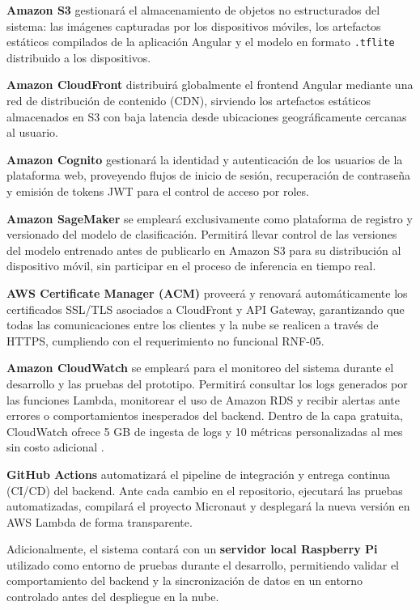 \textbf{Amazon S3} gestionará el almacenamiento de objetos no
estructurados del sistema: las imágenes capturadas por los dispositivos
móviles, los artefactos estáticos compilados de la aplicación Angular
y el modelo en formato \texttt{.tflite} distribuido a los dispositivos.

\textbf{Amazon CloudFront} distribuirá globalmente el frontend Angular
mediante una red de distribución de contenido (CDN), sirviendo los
artefactos estáticos almacenados en S3 con baja latencia desde
ubicaciones geográficamente cercanas al usuario.

\textbf{Amazon Cognito} gestionará la identidad y autenticación de
los usuarios de la plataforma web, proveyendo flujos de inicio de
sesión, recuperación de contraseña y emisión de tokens JWT para el
control de acceso por roles.

\textbf{Amazon SageMaker} se empleará exclusivamente como plataforma
de registro y versionado del modelo de clasificación. Permitirá llevar
control de las versiones del modelo entrenado antes de publicarlo en
Amazon S3 para su distribución al dispositivo móvil, sin participar
en el proceso de inferencia en tiempo real.

\textbf{AWS Certificate Manager (ACM)} proveerá y renovará
automáticamente los certificados SSL/TLS asociados a CloudFront y
API Gateway, garantizando que todas las comunicaciones entre los
clientes y la nube se realicen a través de HTTPS, cumpliendo con el
requerimiento no funcional RNF-05.

\textbf{Amazon CloudWatch} se empleará para el monitoreo del sistema
durante el desarrollo y las pruebas del prototipo. Permitirá consultar
los logs generados por las funciones Lambda, monitorear el uso de
Amazon RDS y recibir alertas ante errores o comportamientos inesperados
del backend. Dentro de la capa gratuita, CloudWatch ofrece 5 GB de
ingesta de logs y 10 métricas personalizadas al mes sin costo adicional
\cite{aws_free_tier}.

\textbf{GitHub Actions} automatizará el pipeline de integración y
entrega continua (CI/CD) del backend. Ante cada cambio en el
repositorio, ejecutará las pruebas automatizadas, compilará el
proyecto Micronaut y desplegará la nueva versión en AWS Lambda de
forma transparente.

Adicionalmente, el sistema contará con un \textbf{servidor local
Raspberry Pi} utilizado como entorno de pruebas durante el desarrollo,
permitiendo validar el comportamiento del backend y la sincronización
de datos en un entorno controlado antes del despliegue en la nube.